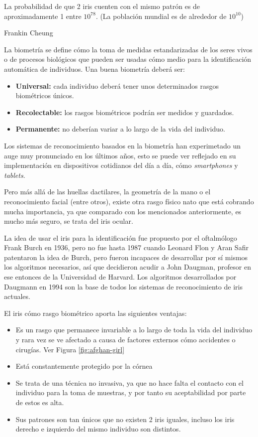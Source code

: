 
\epigraph{La probabilidad de que 2 iris cuenten con el mismo patrón es de aproximadamente 1 entre $10^{78}$. (La población mundial es de alrededor de $10^{10}$)}{Frankin Cheung}

La biometría se define cómo la toma de medidas estandarizadas de los seres vivos o de procesos biológicos \cite{intro:bio-wiki} que pueden ser usadas cómo medio para la identificación automática de individuos. 
Una buena biometría deberá ser:
\begin{itemize}
	\item \textbf{Universal:} cada individuo deberá tener unos determinados rasgos biométricos únicos.
	\item \textbf{Recolectable:} los rasgos biométricos podrán ser medidos y guardados.
	\item \textbf{Permanente:} no deberían variar a lo largo de la vida del individuo.
\end{itemize}
Los sistemas de reconocimiento basados en la biometría han experimetado un auge muy pronunciado en los últimos años, esto se puede ver reflejado en su implementación en dispositivos cotidianos del día a día, cómo \emph{smartphones} y \emph{tablets}.

Pero más allá de las huellas dactilares, la geometría de la mano o el reconocimiento facial (entre otros), existe otra rasgo físico nato que está cobrando mucha importancia, ya que comparado con los mencionados anteriormente, es mucho más seguro, se trata del iris ocular.

La idea de usar el iris para la identificación fue propuesto por el oftalmólogo Frank Burch en 1936, pero no fue hasta 1987 cuando Leonard Flon y Aran Safir patentaron la idea de Burch, pero fueron incapaces de desarrollar por sí mismos los algoritmos necesarios, así que decidieron acudir a John Daugman, profesor en ese entonces de la Universidad de Harvard.
Los algoritmos desarrollados por Daugmann en 1994 son la base de todos los sistemas de reconocimiento de iris actuales\cite{intro:iris-rec}.

El iris cómo rasgo biométrico aporta las siguientes ventajas\cite{intro:iris-bio}:
\begin{itemize}
	\item Es un rasgo que permanece invariable a lo largo de toda la vida del individuo y rara vez se ve afectado a causa de factores externos cómo accidentes o cirugías. Ver Figura \ref{fig:afghan-girl}
	\item Está constantemente protegido por la córnea
	\item Se trata de una técnica no invasiva, ya que no hace falta el contacto con el individuo para la toma de muestras, y por tanto su aceptabilidad por parte de estos es alta.
	\item Sus patrones son tan únicos que no existen 2 iris iguales, incluso los iris derecho e izquierdo del mismo individuo son distintos.
\end{itemize}

